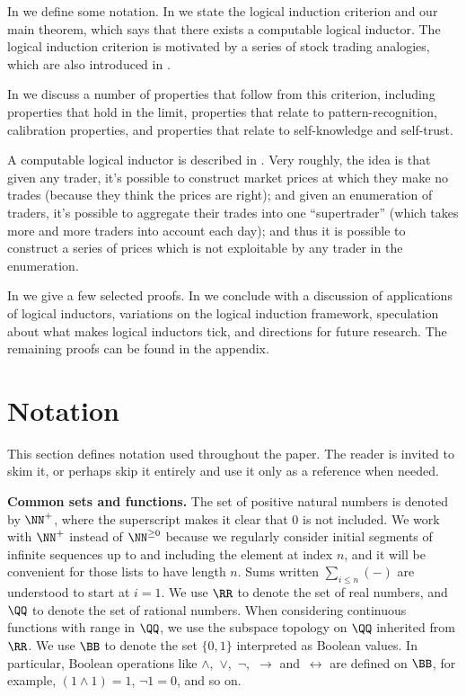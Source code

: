 \documentclass[authordate,onecolumn,noenvironments]{miri-tech-article}
\numberwithin{equation}{subsection}
\renewcommand{\implies}{\rightarrow}
\renewcommand{\iff}{\leftrightarrow}
\newcommand{\any}{-}
\newcommand{\nn}{n}
\newcommand{\li}{logical inductor}
\newcommand{\lic}{logical induction criterion}
\newcommand{\tinysection}[1]{\medskip\noindent\textbf{#1.}}
\begin{document}
In  we define some notation. In  we state the logical induction criterion and our main theorem, which says that there exists a computable logical inductor. The \lic{} is motivated by a series of stock trading analogies, which are also introduced in .

In  we discuss a number of properties that follow from this criterion, including properties that hold in the limit, properties that relate to pattern-recognition, calibration properties, and properties that relate to self-knowledge and self-trust.

A computable \li{} is described in . Very roughly, the idea is that given any trader, it's possible to construct market prices at which they make no trades (because they think the prices are right); and given an enumeration of traders, it's possible to aggregate their trades into one ``supertrader'' (which takes more and more traders into account each day); and thus it is possible to construct a series of prices which is not exploitable by any trader in the enumeration.

In  we give a few selected proofs. In  we conclude with a discussion of applications of logical inductors, variations on the logical induction framework, speculation about what makes logical inductors tick, and directions for future research. The remaining proofs can be found in the appendix.


\section{Notation}\label{sec:notation}

This section defines notation used throughout the paper. The reader is invited to skim it, or perhaps skip it entirely and use it only as a reference when needed.

\tinysection{Common sets and functions} The set of positive natural numbers is denoted by ${\NN^+}$, where the superscript makes it clear that 0 is not included. We work with $\NN^+$ instead of $\NN^{\ge 0}$ because we regularly consider initial segments of infinite sequences up to and including the element at index $\nn$, and it will be convenient for those lists to have length $\nn$.  Sums written $\sum_{i\leq \nn}(\any)$ are understood to start at $i=1$.  We use $\RR$ to denote the set of real numbers, and $\QQ$ to denote the set of rational numbers. When considering continuous functions with range in $\QQ$, we use the subspace topology on $\QQ$ inherited from $\RR$. We use $\BB$ to denote the set $\{0, 1\}$ interpreted as Boolean values. In particular, Boolean operations like $\land$,~$\lor$,~$\lnot$,~$\implies$ and~$\iff$ are defined on $\BB$, for example, $(1\land 1) = 1$, $\lnot 1 = 0$, and so on.
\end{document}
